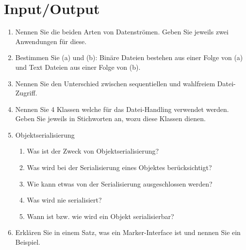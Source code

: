 \newpage
\section{Input/Output}

\begin{enumerate}
    \item Nennen Sie die beiden Arten von Datenströmen. Geben Sie
        jeweils zwei Anwendungen für diese. 	
    \item Bestimmen Sie (a) und (b): Binäre Dateien bestehen aus 
        einer Folge von (a) und Text Dateien aus einer Folge von (b).	
    \item Nennen Sie den Unterschied zwischen sequentiellen und 
        wahlfreiem Datei-Zugriff.
    \item Nennen Sie 4 Klassen welche für das Datei-Handling verwendet
        werden. Geben Sie jeweils in Stichworten an, wozu diese
        Klassen dienen.
    \item Objektserialisierung
        \begin{enumerate}[label=(\alph*)]
            \item Was ist der Zweck von Objektserialisierung?
            \item Was wird bei der Serialisierung eines Objektes 
                berücksichtigt?
            \item Wie kann etwas von der Serialisierung ausgeschlossen
                werden?
            \item Was wird nie serialisiert? 
            \item Wann ist bzw. wie wird ein Objekt serialisierbar?
        \end{enumerate} 	
    \item Erklären Sie in einem Satz, was ein Marker-Interface
        ist und nennen Sie ein Beispiel.
\end{enumerate}
